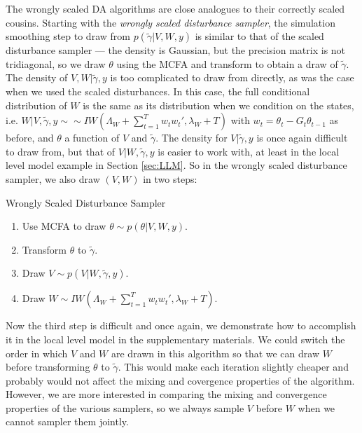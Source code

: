 \documentclass{article}
\begin{document}
The wrongly scaled DA algorithms are close analogues to their correctly scaled cousins. Starting with the {\it wrongly scaled disturbance sampler}, the simulation smoothing step to draw from $p(\tilde{\gamma}|V,W,y)$ is similar to that of the scaled disturbance sampler --- the density is Gaussian, but the precision matrix is not tridiagonal, so we draw $\theta$ using the MCFA and transform to obtain a draw of $\tilde{\gamma}$. The density of $V,W|\tilde{\gamma},y$ is too complicated to draw from directly, as was the case when we used the scaled disturbances. In this case, the full conditional distribution of $W$ is the same as its distribution when we condition on the states, i.e. $W|V,\tilde{\gamma},y \sim \sim IW\left(\Lambda_W + \sum_{t=1}^Tw_tw_t',\lambda_{W} + T\right)$ with $w_t = \theta_t - G_t\theta_{t-1}$ as before, and $\theta$ a function of $V$ and $\tilde{\gamma}$. The density for $V|\tilde{\gamma},y$ is once again difficult to draw from, but that of $V|W,\tilde{\gamma},y$ is easier to work with, at least in the local level model example in Section \ref{sec:LLM}. So in the wrongly scaled disturbance sampler, we also draw $(V,W)$ in two steps: 
\begin{alg*}[WSD]Wrongly Scaled Disturbance Sampler\label{alg:DLMwdist}
\begin{enumerate}
\item Use MCFA to draw $\theta \sim p(\theta|V,W,y)$.
\item Transform $\theta$ to $\tilde{\gamma}$.
\item Draw $V \sim p(V|W,\tilde{\gamma},y)$.
\item Draw $W \sim IW\left(\Lambda_W + \sum_{t=1}^Tw_tw_t',\lambda_{W} + T\right)$.
\end{enumerate}
\end{alg*}\noindent
Now the third step is difficult and once again, we demonstrate how to accomplish it in the local level model in the supplementary materials. We could switch the order in which $V$ and $W$ are drawn in this algorithm so that we can draw $W$ before transforming $\theta$ to $\tilde{\gamma}$. This would make each iteration slightly cheaper and probably would not affect the mixing and covergence properties of the algorithm. However, we are more interested in comparing the mixing and convergence properties of the various samplers, so we always sample $V$ before $W$ when we cannot sampler them jointly.
\end{document}
